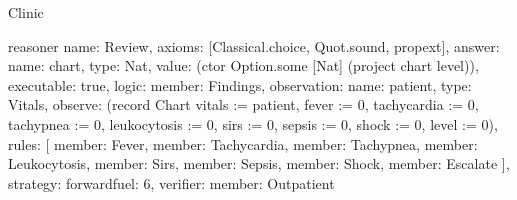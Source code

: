 \begin{lexlean}{Clinic}
\begin{semanticmodule}
reasoner{
  name: Review,
  axioms: [Classical.choice, Quot.sound, propext],
  answer: {name: chart, type: Nat, value: (ctor Option.some [Nat] (project chart level))},
  executable: true,
  logic: {member: Findings},
  observation: {name: patient, type: Vitals},
  observe: (record Chart {vitals := patient, fever := 0, tachycardia := 0, tachypnea := 0, leukocytosis := 0, sirs := 0, sepsis := 0, shock := 0, level := 0}),
  rules: [
    {member: Fever},
    {member: Tachycardia},
    {member: Tachypnea},
    {member: Leukocytosis},
    {member: Sirs},
    {member: Sepsis},
    {member: Shock},
    {member: Escalate}
  ],
  strategy: forward{fuel: 6},
  verifier: {member: Outpatient}
}
\end{semanticmodule}
\end{lexlean}

